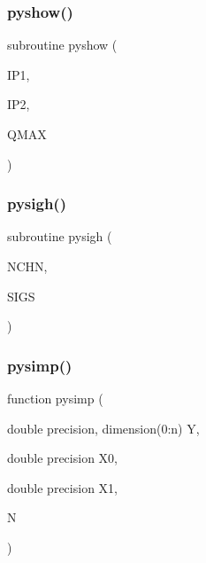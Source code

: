 \subsubsection{\texorpdfstring{pyshow()}{pyshow()}}
{\footnotesize\ttfamily subroutine pyshow (\begin{DoxyParamCaption}\item[{}]{I\+P1,  }\item[{}]{I\+P2,  }\item[{}]{Q\+M\+AX }\end{DoxyParamCaption})}

\mbox{\label{pythia-6_84_824_8f_a3ccdee32be69df9daf5605283165a012}} 
\subsubsection{\texorpdfstring{pysigh()}{pysigh()}}
{\footnotesize\ttfamily subroutine pysigh (\begin{DoxyParamCaption}\item[{}]{N\+C\+HN,  }\item[{}]{S\+I\+GS }\end{DoxyParamCaption})}

\mbox{\label{pythia-6_84_824_8f_a743f71aa398768156c651708fff83733}} 
\subsubsection{\texorpdfstring{pysimp()}{pysimp()}}
{\footnotesize\ttfamily function pysimp (\begin{DoxyParamCaption}\item[{double precision, dimension(0\+:n)}]{Y,  }\item[{double precision}]{X0,  }\item[{double precision}]{X1,  }\item[{}]{N }\end{DoxyParamCaption})}

\mbox{\label{pythia-6_84_824_8f_a424b8829609278da2e93ca1bc93b36be}} 

